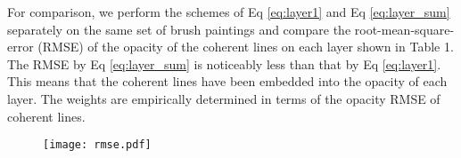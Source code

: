 For comparison, we perform the schemes of Eq \ref{eq:layer1} and Eq \ref{eq:layer_sum} separately on the same set of brush paintings and compare the root-mean-square-error (RMSE) of the opacity of the coherent lines on each layer shown in Table 1. The RMSE by Eq \ref{eq:layer_sum} is noticeably less than that by Eq \ref{eq:layer1}. This means that the coherent lines have been embedded into the opacity of each layer. The weights are empirically determined in terms of the opacity RMSE of coherent lines.

\begin{figure}
	\centering
	\texttt{[image: rmse.pdf]}

\end{figure}


















